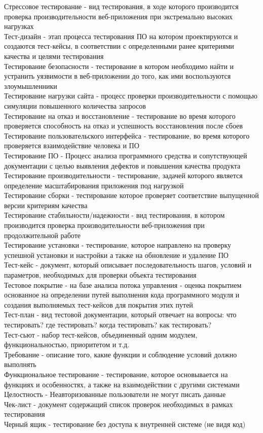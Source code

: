 \documentclass[11pt]{article}
\begin{document}
Стрессовое тестирование - вид тестирования, в ходе которого производится проверка производительности веб-приложения при экстремально высоких нагрузках \\
Тест-дизайн - этап процесса тестирования ПО на котором проектируются и создаются тест-кейсы, в соответствии с определенными ранее критериями качества и целями тестирования \\
Тестирование безопасности - тестирование в котором необходимо найти и устранить уязвимости в веб-приложении до того, как ими воспользуются злоумышленники \\
Тестирование нагрузки сайта - процесс проверки производительности с помощью симуляции повышенного количества запросов \\
Тестирование на отказ и восстановление - тестирование во время которого проверяется способность на отказ и успешность восстановления после сбоев \\
Тестирование пользовательского интерфейса - тестирование, во время которого проверяется взаимодействие человека и ПО \\
Тестирование ПО - Процесс анализа программного средства и сопутствующей документации с целью выявления дефектов и повышения качества продукта \\
Тестирование производительности - тестирование, задачей которого является определение масштабирования приложения под нагрузкой \\
Тестирование сборки - тестирование которое проверяет соответствие выпущенной версии критериям качества \\
Тестирование стабильности/надежности - вид тестирования, в котором производится проверка производительности веб-приложения при продолжительной работе \\
Тестирование установки - тестирование, которое направлено на проверку успешной установки и настройки а также на обновление и удаление ПО \\
Тест-кейс - документ, который описывает последовательность шагов, условий и параметров, необходимых для проверки объекта тестирования \\
Тестовое покрытие - на базе анализа потока управления - оценка покрытием основанное на определении путей выполнения кода программного модуля и создания выполняемых тест-кейсов для покрытия этих путей \\
Тест-план - вид тестовой документации, который отвечает на вопросы: что тестировать? где тестировать? когда тестировать? как тестировать? \\
Тест-сьют - набор тест-кейсов, объединенный одним модулем, функциональностью, приоритетом и т.д. \\
Требование - описание того, какие функции и соблюдение условий должно выполнять \\
Функциональное тестирование - тестирование, которое основывается на функциях и особенностях, а также на взаимодействии с другими системами \\
Целостность - Неавторизованные пользователи не могут писать данные \\
Чек-лист - документ содержащий список проверок необходимых в рамках тестирования \\
Черный ящик - тестирование без доступа к внутренней системе (не видя код) \\
\end{document}
